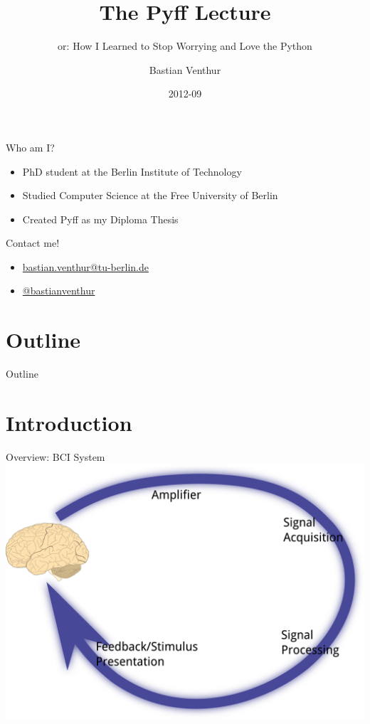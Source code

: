 \documentclass{beamer}
\title{The Pyff Lecture}
\subtitle{or: How I Learned to Stop Worrying and Love the Python}
\author{Bastian Venthur}
\institute{Berlin Institute of Technology}
\date{2012-09}
\begin{document}
\begin{frame}[plain]
    \titlepage
\end{frame}

\begin{frame}{Who am I?}
    \begin{itemize}
        \item PhD student at the Berlin Institute of Technology
        \item Studied Computer Science at the Free University of Berlin
        \item Created Pyff as my Diploma Thesis
    \end{itemize}
    \vfill
    \begin{block}{Contact me!}
        \begin{itemize}
            \item \href{mailto:bastian.venthur@tu-berlin.de}{bastian.venthur@tu-berlin.de}
            \item \href{http://twitter.com/bastianventhur}{@bastianventhur}
        \end{itemize}
    \end{block}
\end{frame}

\section*{Outline}
\begin{frame}{Outline}
    \tableofcontents[hidesubsections]
\end{frame}

\section{Introduction}
\begin{frame}{Overview: BCI System}
    \includegraphics[width=\linewidth]{bci_system}
\end{frame}
\end{document}
